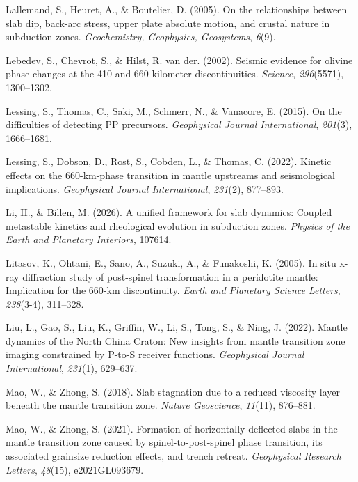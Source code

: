 \documentclass[draft,linenumbers]{agujournal2019}
\newlength{\cslhangindent}
\newenvironment{CSLReferences}[2]
 {\begin{list}{}{
  \setlength{\itemindent}{0pt}
  \setlength{\leftmargin}{0pt}
  \setlength{\parsep}{0pt}
  \ifodd #1
   \setlength{\leftmargin}{\cslhangindent}
   \setlength{\itemindent}{-\cslhangindent}
  \fi
  \setlength{\itemsep}{#2\baselineskip}
  }
  \item\relax}
 {\end{list}}
\begin{document}
\begin{CSLReferences}{1}{0}
Lallemand, S., Heuret, A., \& Boutelier, D. (2005). On the relationships
between slab dip, back-arc stress, upper plate absolute motion, and
crustal nature in subduction zones. \emph{Geochemistry, Geophysics,
Geosystems}, \emph{6}(9).

Lebedev, S., Chevrot, S., \& Hilst, R. van der. (2002). Seismic evidence
for olivine phase changes at the 410-and 660-kilometer discontinuities.
\emph{Science}, \emph{296}(5571), 1300--1302.

Lessing, S., Thomas, C., Saki, M., Schmerr, N., \& Vanacore, E. (2015).
On the difficulties of detecting {PP} precursors. \emph{Geophysical
Journal International}, \emph{201}(3), 1666--1681.

Lessing, S., Dobson, D., Rost, S., Cobden, L., \& Thomas, C. (2022).
Kinetic effects on the 660-km-phase transition in mantle upstreams and
seismological implications. \emph{Geophysical Journal International},
\emph{231}(2), 877--893.

Li, H., \& Billen, M. (2026). A unified framework for slab dynamics:
Coupled metastable kinetics and rheological evolution in subduction
zones. \emph{Physics of the Earth and Planetary Interiors}, 107614.

Litasov, K., Ohtani, E., Sano, A., Suzuki, A., \& Funakoshi, K. (2005).
In situ x-ray diffraction study of post-spinel transformation in a
peridotite mantle: Implication for the 660-km discontinuity. \emph{Earth
and Planetary Science Letters}, \emph{238}(3-4), 311--328.

Liu, L., Gao, S., Liu, K., Griffin, W., Li, S., Tong, S., \& Ning, J.
(2022). Mantle dynamics of the {North China Craton}: New insights from
mantle transition zone imaging constrained by {P-to-S} receiver
functions. \emph{Geophysical Journal International}, \emph{231}(1),
629--637.

Mao, W., \& Zhong, S. (2018). Slab stagnation due to a reduced viscosity
layer beneath the mantle transition zone. \emph{Nature Geoscience},
\emph{11}(11), 876--881.

Mao, W., \& Zhong, S. (2021). Formation of horizontally deflected slabs
in the mantle transition zone caused by spinel-to-post-spinel phase
transition, its associated grainsize reduction effects, and trench
retreat. \emph{Geophysical Research Letters}, \emph{48}(15),
e2021GL093679.


\end{CSLReferences}
\end{document}
